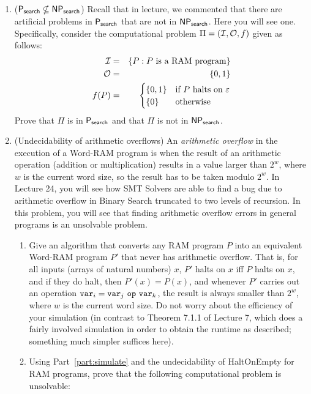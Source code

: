 \documentclass[11pt]{article}
\begin{document}
\begin{enumerate}

    \item ($\mathsf{P_{search}}\nsubseteq \mathsf{NP_{search}}$)  Recall that in lecture, we commented that there are artificial problems in $\mathsf{P_{search}}$ that are not in $\mathsf{NP_{search}}$.  Here you will see one.  Specifically, consider the computational problem $\Pi=(\mathcal{I},\mathcal{O},f)$ given as follows:
    \begin{eqnarray*}
    \mathcal{I} &=& \{ P : \text{$P$ is a RAM program}\}\\
    \mathcal{O} &=& \{0,1\}\\
    f(P) &=& \begin{cases} \{0,1\} & \text{if $P$ halts on $\varepsilon$}\\
    \{0\} & \text{otherwise}\\
    \end{cases}
    \end{eqnarray*}
    Prove that $\Pi$ is in $\mathsf{P_{search}}$ and that $\Pi$ is not in $\mathsf{NP_{search}}$.

  \item (Undecidability of arithmetic overflows) An {\em arithmetic overflow} in the execution of a Word-RAM program is when the result of an arithmetic operation (addition or multiplication) results in a value larger than $2^w$, where $w$ is the current word size, so the result has to be taken modulo $2^w$. In Lecture 24, you will see how SMT Solvers are able to find a bug due to arithmetic overflow in Binary Search truncated to two levels of recursion.  In this problem, you will see that finding arithmetic overflow errors in general programs is an unsolvable problem.

  \begin{enumerate}
      \item Give an algorithm that converts any RAM program $P$ into an equivalent Word-RAM program $P'$ that never has arithmetic overflow.  That is, for all inputs (arrays of natural numbers) $x$, $P'$ halts on $x$ iff $P$ halts on $x$, and if they do halt, then $P'(x)=P(x)$, and whenever $P'$ carries out an operation $\var_i = \var_j\ \op\ \var_k$, the result is always smaller than $2^w$, where $w$ is the current word size.  Do not worry about the efficiency of your simulation (in contrast to Theorem 7.1.1 of Lecture 7, which does a fairly involved simulation in order to obtain the runtime as described; something much simpler suffices here).
      \label{part:simulate}

      \item Using Part~\ref{part:simulate} and the undecidability of HaltOnEmpty for RAM programs, prove that the following computational problem is unsolvable:


\end{enumerate}
\end{enumerate}
\end{document}
